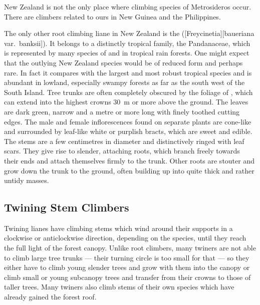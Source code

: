 New Zealand is not the only place where climbing species of Metrosideros occur.
There are climbers related to ours in New Guinea and the Philippines.

The only other root climbing liane in New Zealand is the  ([Freycinetia][baueriana var.\ banksii]).
It belongs to a distinctly tropical family, the Pandanaceae, which is represented by many species of  and  in tropical rain forests.
One might expect that the outlying New Zealand species would be of reduced form and perhaps rare.
In fact it compares with the largest and most robust tropical species and is abundant in lowland, especially swampy forests as far as the south west of the South Island.
Tree trunks are often completely obscured by the foliage of , which can extend into the highest crowns \SI{30}{\metre} or more above the ground.
The leaves are dark green, narrow and a metre or more long with finely toothed cutting edges.
The male and female inflorescences found on separate plants are cone-like and surrounded by leaf-like white or purplish bracts, which are sweet and edible.
The stems are a few centimetres in diameter and distinctively ringed with leaf scars.
They give rise to slender, attaching roots, which branch freely towards their ends and attach themselves firmly to the trunk.
Other roots are stouter and grow down the trunk to the ground, often building up into quite thick and rather untidy masses.

\subsection{Twining Stem Climbers}

Twining lianes have climbing stems which wind around their supports in a clockwise or anticlockwise direction, depending on the species, until they reach the full light of the forest canopy.
Unlike root climbers, many twiners are not able to climb large tree trunks --- their turning circle is too small for that --- so they either have to climb young slender trees and grow with them into the canopy or climb small or young subcanopy trees and transfer from their crowns to those of taller trees.
Many twiners also climb stems of their own species which have already gained the forest roof.

